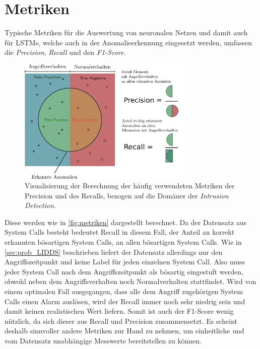                 \fi

\section{Metriken}\label{sec:Metriken}

    Typische Metriken für die Auswertung von neuronalen Netzen und damit auch für \acp{LSTM}, welche auch in der Anomalieerkennung eingesetzt werden, umfassen die \textit{Precision}, \textit{Recall} und den \textit{F1-Score}.
    \begin{figure}
        \centering
        \includegraphics[width=0.75\textwidth]{images/Illustrationen/Precision.pdf}
        \caption[Darstellung Precision und Recall]{Visualisierung der Berechnung der häufig verwendeten Metriken der Precision und des Recalls, bezogen auf die Domäner der \textit{Intrusion Detection}.}\label{fig:metriken}
    \end{figure}
    Diese werden wie in \autoref{fig:metriken} dargestellt berechnet.
    Da der Datensatz aus System Calls besteht bedeutet Recall in diesem Fall, der Anteil an korrekt erkannten bösartigen System Calls, an allen bösartigen System Calls.
    Wie in \autoref{sec:prob_LIDDS} beschrieben liefert der Datensatz allerdings nur den Angriffszeitpunkt und keine Label für jeden einzelnen System Call.
    Also muss jeder System Call nach dem Angriffszeitpunkt als bösartig eingestuft werden, obwohl neben dem Angriffsverhalten noch Normalverhalten stattfindet.
    Wird von einem optimalen Fall ausgegangen, dass alle dem Angriff zugehörigen System Calls einen Alarm auslösen, wird der Recall immer noch sehr niedrig sein und damit keinen realistischen Wert liefern.
    Somit ist auch der F1-Score wenig nützlich, da sich dieser aus Recall und Precision zusammensetzt.
    Es scheint deshalb sinnvoller andere Metriken zur Hand zu nehmen, um einheitliche und vom Datensatz unabhängige Messwerte bereitstellen zu können. 
